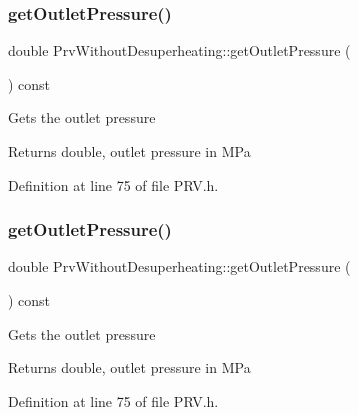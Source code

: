 \subsubsection{\texorpdfstring{get\+Outlet\+Pressure()}{getOutletPressure()}\hspace{0.1cm}{\footnotesize\ttfamily [2/3]}}
{\footnotesize\ttfamily double Prv\+Without\+Desuperheating\+::get\+Outlet\+Pressure (\begin{DoxyParamCaption}{ }\end{DoxyParamCaption}) const\hspace{0.3cm}{\ttfamily [inline]}}

Gets the outlet pressure

\begin{DoxyReturn}{Returns}
double, outlet pressure in M\+Pa 
\end{DoxyReturn}


Definition at line 75 of file P\+R\+V.\+h.

\mbox{\label{class_prv_without_desuperheating_ae1d335703442deec2f2c2f93e4c862f2}} 
\subsubsection{\texorpdfstring{get\+Outlet\+Pressure()}{getOutletPressure()}\hspace{0.1cm}{\footnotesize\ttfamily [3/3]}}
{\footnotesize\ttfamily double Prv\+Without\+Desuperheating\+::get\+Outlet\+Pressure (\begin{DoxyParamCaption}{ }\end{DoxyParamCaption}) const\hspace{0.3cm}{\ttfamily [inline]}}

Gets the outlet pressure

\begin{DoxyReturn}{Returns}
double, outlet pressure in M\+Pa 
\end{DoxyReturn}


Definition at line 75 of file P\+R\+V.\+h.

\mbox{\label{class_prv_without_desuperheating_afcf1f5d7e6b18643ac8adc9023578147}} 
